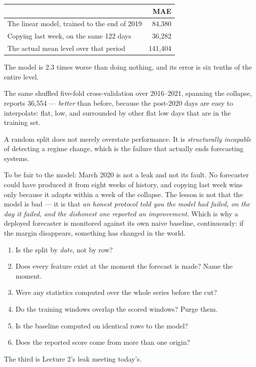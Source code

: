 \documentclass[11pt,a4paper]{article}
\begin{document}
\begin{center}
\small
\begin{tabular}{lr}
\toprule
& \textbf{MAE} \\
\midrule
The linear model, trained to the end of 2019 & 84{,}380 \\
Copying last week, on the same 122 days & 36{,}282 \\
The actual mean level over that period & 141{,}404 \\
\bottomrule
\end{tabular}
\end{center}

The model is 2.3 times worse than doing nothing, and its error is six tenths of
the entire level.

\begin{failbox}[title={Failure condition --- and the shuffled split cannot see it at all}]
The same shuffled five-fold cross-validation over 2016--2021, spanning the
collapse, reports 36{,}554 --- \emph{better} than before, because the post-2020
days are easy to interpolate: flat, low, and surrounded by other flat low days
that are in the training set.

A random split does not merely overstate performance. It is \emph{structurally
incapable} of detecting a regime change, which is the failure that actually
ends forecasting systems.
\end{failbox}

To be fair to the model: March 2020 is not a leak and not its fault. No
forecaster could have produced it from eight weeks of history, and copying last
week wins only because it adapts within a week of the collapse. The lesson is
not that the model is bad --- it is that \emph{an honest protocol told you the
model had failed, on the day it failed, and the dishonest one reported an
improvement}. Which is why a deployed forecaster is monitored against its own
naive baseline, continuously: if the margin disappears, something has changed
in the world.

\begin{keybox}[title={Temporal leakage checklist}]
\begin{enumerate}[leftmargin=1.6em,itemsep=1pt]
  \item Is the split by \emph{date}, not by row?
  \item Does every feature exist at the moment the forecast is made? Name the
        moment.
  \item Were any statistics computed over the whole series before the cut?
  \item Do the training windows overlap the scored windows? Purge them.
  \item Is the baseline computed on identical rows to the model?
  \item Does the reported score come from more than one origin?
\end{enumerate}
The third is Lecture 2's leak meeting today's.
\end{keybox}
\end{document}
